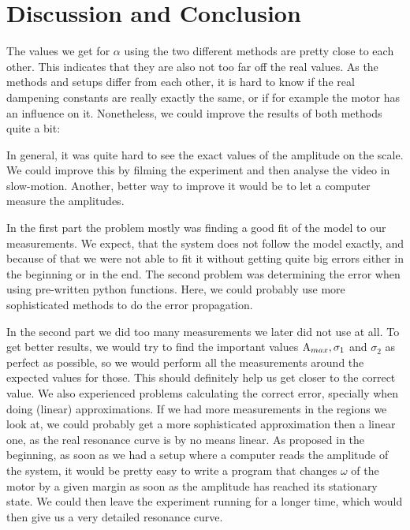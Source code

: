 \section{Discussion and Conclusion}
The values we get for $\alpha$ using the two different methods are pretty close to each other.
This indicates that they are also not too far off the real values.
As the methods and setups differ from each other, it is hard to know if the real dampening constants are really exactly the same, or if for example the motor has an influence on it. 
Nonetheless, we could improve the results of both methods quite a bit:

In general, it was quite hard to see the exact values of the amplitude on the scale.
We could improve this by filming the experiment and then analyse the video in slow-motion.
Another, better way to improve it would be to let a computer measure the amplitudes.

In the first part the problem mostly was finding a good fit of the model to our measurements.
We expect, that the system does not follow the model exactly, and because of that we were not able to fit it without getting quite big errors either in the beginning or in the end.
The second problem was determining the error when using pre-written python functions.
Here, we could probably use more sophisticated methods to do the error propagation.  

In the second part we did too many measurements we later did not use at all.
To get better results, we would try to find the important values $\A_{max}, \sigma_1$ and $\sigma_2$ as perfect as possible, so we would perform all the measurements around the expected values for those.
This should definitely help us get closer to the correct value.
We also experienced problems calculating the correct error, specially when doing (linear) approximations.
If we had more measurements in the regions we look at, we could probably get a more sophisticated approximation then a linear one, as the real resonance curve is by no means linear.
As proposed in the beginning, as soon as we had a setup where a computer reads the amplitude of the system, it would be pretty easy to write a program that changes $\omega$ of the motor by a given margin as soon as the amplitude has reached its stationary state.
We could then leave the experiment running for a longer time, which would then give us a very detailed resonance curve.